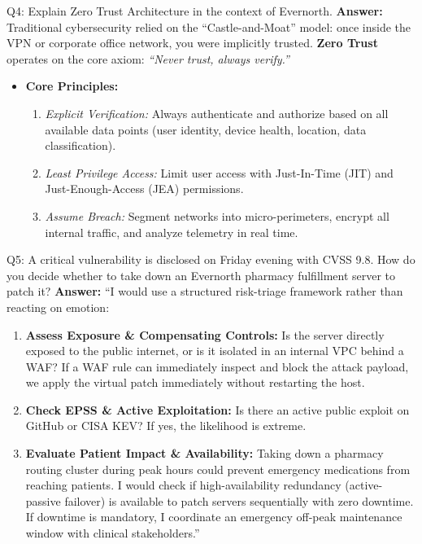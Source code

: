 \documentclass[10pt,a4paper]{article}
\begin{document}
\begin{qa}{Q4: Explain Zero Trust Architecture in the context of Evernorth.}
\textbf{Answer:}
Traditional cybersecurity relied on the ``Castle-and-Moat'' model: once inside the VPN or corporate office network, you were implicitly trusted. \textbf{Zero Trust} operates on the core axiom: \textit{``Never trust, always verify.''}
\begin{itemize}[noitemsep]
    \item \textbf{Core Principles:}
    \begin{enumerate}[noitemsep]
        \item \textit{Explicit Verification:} Always authenticate and authorize based on all available data points (user identity, device health, location, data classification).
        \item \textit{Least Privilege Access:} Limit user access with Just-In-Time (JIT) and Just-Enough-Access (JEA) permissions.
        \item \textit{Assume Breach:} Segment networks into micro-perimeters, encrypt all internal traffic, and analyze telemetry in real time.
    \end{enumerate}
\end{itemize}
\end{qa}

\begin{qa}{Q5: A critical vulnerability is disclosed on Friday evening with CVSS 9.8. How do you decide whether to take down an Evernorth pharmacy fulfillment server to patch it?}
\textbf{Answer:}
``I would use a structured risk-triage framework rather than reacting on emotion:
\begin{enumerate}[noitemsep]
    \item \textbf{Assess Exposure \& Compensating Controls:} Is the server directly exposed to the public internet, or is it isolated in an internal VPC behind a WAF? If a WAF rule can immediately inspect and block the attack payload, we apply the virtual patch immediately without restarting the host.
    \item \textbf{Check EPSS \& Active Exploitation:} Is there an active public exploit on GitHub or CISA KEV? If yes, the likelihood is extreme.
    \item \textbf{Evaluate Patient Impact \& Availability:} Taking down a pharmacy routing cluster during peak hours could prevent emergency medications from reaching patients. I would check if high-availability redundancy (active-passive failover) is available to patch servers sequentially with zero downtime. If downtime is mandatory, I coordinate an emergency off-peak maintenance window with clinical stakeholders.''
\end{enumerate}
\end{qa}
\end{document}
